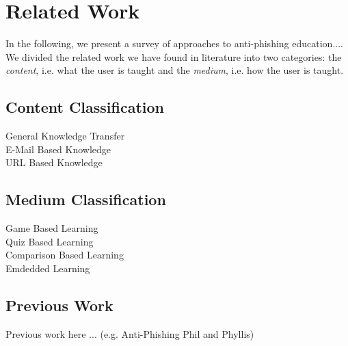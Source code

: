 
\section{Related Work}
\label{s:related_work}

In the following, we present a survey of approaches to anti-phishing education....
We divided the related work we have found in literature into two categories: the \textit{content}, i.e. what the user is taught and the 
\textit{medium}, i.e. how the user is taught. 

\subsection{Content Classification}

\begin{description}
	\item[General Knowledge Transfer]
	\item[E-Mail Based Knowledge]
	\item[URL Based Knowledge]
\end{description}

\subsection{Medium Classification}
\begin{description}
	\item[Game Based Learning]
	\item[Quiz Based Learning]
	\item[Comparison Based Learning]
	\item[Emdedded Learning]
\end{description}

\subsection{Previous Work}
Previous work here ... (e.g. Anti-Phishing Phil and Phyllis)
